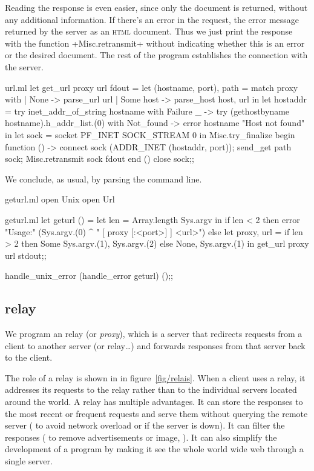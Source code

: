 Reading the response is even easier, since only the document is
returned, without any additional information. If there's an error in
the request, the error message returned by the server as an
\textsc{html} document. Thus we just print the response with the
function \ml+Misc.retransmit+ without indicating whether this is an
error or the desired document. The rest of the program establishes the
connection with the server.
%
\begin{listingcodefile}{url.ml}
let get_url proxy url fdout =
  let (hostname, port), path = match proxy with
    | None -> parse_url url
    | Some host -> parse_host host, url
  in
  let hostaddr =
    try inet_addr_of_string hostname
    with Failure _ ->
      try (gethostbyname hostname).h_addr_list.(0)
      with Not_found -> error hostname "Host not found"
  in
  let sock = socket PF_INET SOCK_STREAM 0 in
  Misc.try_finalize
    begin function () ->
      connect sock (ADDR_INET (hostaddr, port));
      send_get path sock;
      Misc.retransmit sock fdout
    end ()
    close sock;;
\end{listingcodefile}
%
We conclude, as usual, by parsing the command line.
%
\begin{codefile}{geturl.ml}
open Unix
open Url
\end{codefile}
%
\begin{listingcodefile}{geturl.ml}
let geturl () =
  let len =  Array.length Sys.argv in
  if len < 2 then
    error "Usage:" (Sys.argv.(0) ^ " [ proxy [:<port>] ] <url>")
  else
    let proxy, url =
      if len > 2 then Some Sys.argv.(1), Sys.argv.(2) else
      None, Sys.argv.(1)
    in
    get_url proxy url stdout;;

handle_unix_error (handle_error geturl) ();;
\end{listingcodefile}

\subsection*{\label{sec/relay}{\normalfont\http} relay}

We program an {\http} relay (or \emph{proxy}), which is a server 
that redirects {\http} requests from a client to another server
(or relay\ldots) and forwards responses from that server back to the 
client. 

The role of a relay is shown in in figure~\ref{fig/relais}.  When a
client uses a relay, it addresses its requests to the relay rather
than to the individual {\http} servers located
around the world. A relay has multiple advantages. It can store the
responses to the most recent or frequent requests and serve them without
querying the remote server (\eg{} to avoid network overload or if
the server is down). It can filter the responses (\eg{} to remove
advertisements or image, \etc). It can also simplify the development
of a program by making it see the whole world wide web through a
single server.

